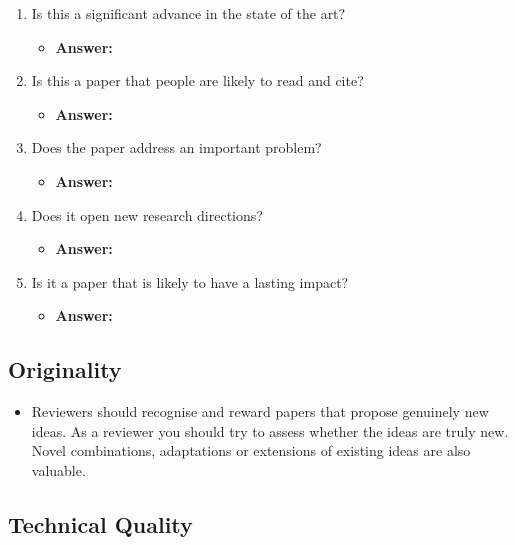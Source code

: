 \documentclass[a4paper]{article}
\begin{document}
\begin{enumerate}[label=(\alph*)]
	\item Is this a significant advance in the state of the art?
		\begin{itemize}
			\item \textbf{Answer:}	
		\end{itemize}			
	
	\item Is this a paper that people are likely to read and cite?
		\begin{itemize}
			\item \textbf{Answer:}	
		\end{itemize}			
	
	\item Does the paper address an important problem?
		\begin{itemize}
			\item \textbf{Answer:}	
		\end{itemize}			
	
	\item Does it open new research directions?
		\begin{itemize}
			\item \textbf{Answer:}	
		\end{itemize}			
	
	\item Is it a paper that is likely to have a lasting impact?
		\begin{itemize}
			\item \textbf{Answer:}	
		\end{itemize}		
\end{enumerate}

\subsection{Originality}

\begin{itemize}
	\item Reviewers should recognise and reward papers that propose genuinely new ideas. As a reviewer you should try to assess whether the ideas are truly new. Novel combinations, adaptations or extensions of existing ideas are also valuable.
\end{itemize}


\subsection{Technical Quality}
\end{document}

